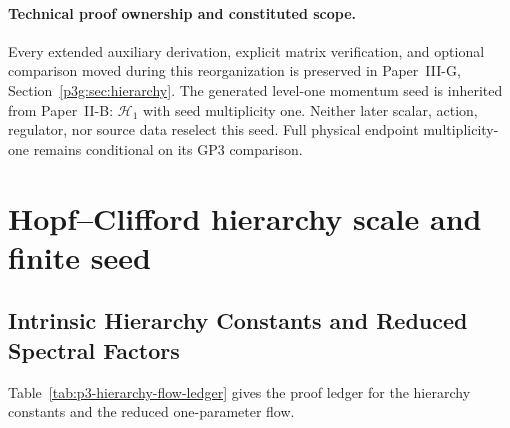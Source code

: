 \documentclass[12pt,a4paper]{article}
\begin{document}
\begingroup
\small
\RaggedRight
\setlength{\emergencystretch}{3em}

\endgroup


\paragraph{Technical proof ownership and constituted scope.}
Every extended auxiliary derivation, explicit matrix verification,
and optional comparison moved during this reorganization is
preserved in Paper~III-G, Section~\ref{p3g:sec:hierarchy}.
The generated level-one momentum seed is inherited from Paper~II-B:
$\mathcal H_1$ with seed multiplicity one.  Neither later scalar,
action, regulator, nor source data reselect this seed.  Full physical
endpoint multiplicity-one remains conditional on its GP3 comparison.

\section{Hopf--Clifford hierarchy scale and finite seed}
\label{paper3c:sec:organized-scale}
\subsection{Intrinsic Hierarchy Constants and Reduced Spectral Factors}
\label{p3:sec:constants}

Table~\ref{tab:p3-hierarchy-flow-ledger} gives the proof ledger for the hierarchy constants and the reduced one-parameter flow.
\end{document}
